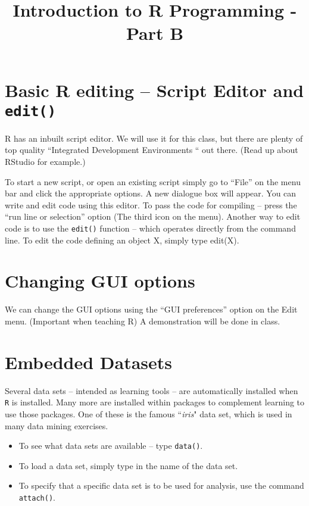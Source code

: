 \documentclass{article}
\title{Introduction to R Programming - Part B}
\date{\vspace{-5ex}}
\begin{document}
\maketitle
\tableofcontents

\section{Basic R editing – Script Editor and \texttt{edit()}}
R has an inbuilt script editor. We will use it for this class, but there are plenty of top quality “Integrated Development Environments “ out there. (Read up about RStudio for  example.)

To start a new script, or open an existing script simply go to “File” on the menu bar and click the appropriate options.
A new dialogue box will appear. You can write and edit code using this editor.
To pass the code for compiling – press the “run line or selection” option (The third icon on the menu).
Another way to edit code is to use the \texttt{edit()} function – which operates directly from the command line.  To edit the code defining an object X, simply type edit(X).
\section{Changing GUI options}
We can change the GUI options using the “GUI preferences” option on the Edit menu. (Important when teaching R)
A demonstration will be done in class. 
\section{Embedded Datasets}
Several data sets – intended as learning tools – are automatically installed when \texttt{R} is installed. Many more are installed within packages to complement learning to use those packages.  One of these is the famous ``\textit{iris}" data set, which is used in many data mining exercises.
\begin{itemize}
\item To see what data sets are available – type \texttt{data()}.
\item To load a data set, simply type in the name of the data set. 
\item To specify that a specific data set is to be used for analysis, use the command \texttt{attach()}.

\end{itemize}
\end{document}
